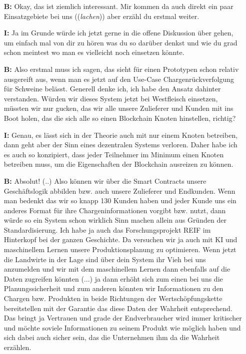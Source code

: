 \begin{itemize}
  \item[\textbf{B:}] Okay, das ist ziemlich interessant. Mir kommen da auch direkt ein paar Einsatzgebiete bei uns ((\textit{lachen})) aber erzähl du erstmal weiter.
  \item[\textbf{I:}] Ja im Grunde würde ich jetzt gerne in die offene Diskussion über gehen, um einfach mal von dir zu hören was du so darüber denkst und wie du grad schon meintest wo man es vielleicht noch einsetzen könnte.
  \item[\textbf{B:}] Also erstmal muss ich sagen, das sieht für einen Prototypen schon relativ ausgereift aus, wenn man es jetzt auf den Use-Case Chargenrückverfolgung für Schweine belässt. Generell denke ich, ich habe den Ansatz dahinter verstanden. Würden wir dieses System jetzt bei Westfleisch einsetzen, müssten wir nur gucken, das wir alle unsere Zulieferer und Kunden mit ins Boot holen, das die sich alle so einen Blockchain Knoten hinstellen, richtig?
  \item[\textbf{I:}] Genau, es lässt sich in der Theorie auch mit nur einem Knoten betreiben, dann geht aber der Sinn eines dezentralen Systems verloren. Daher habe ich es auch so konzipiert, dass jeder Teilnehmer im Minimum einen Knoten betreiben muss, um die Eigenschaften der Blockchain ausreizen zu können.
  \item[\textbf{B:}] Absolut! (..) Also können wir über die Smart Contracts unsere Geschäftslogik abbilden bzw. auch unsere Zulieferer und Endkunden. Wenn man bedenkt das wir so knapp 130 Kunden haben und jeder Kunde uns ein anderes Format für ihre Chargeninformationen vorgibt bzw. nutzt, dann würde so ein System schon wirklich Sinn machen allein aus Gründen der Standardisierung. Ich habe ja auch das Forschungsprojekt REIF im Hinterkopf bei der ganzen Geschichte. Da versuchen wir ja auch mit KI und maschinellem Lernen unsere Produktionsplanung zu optimieren. Wenn jetzt die Landwirte in der Lage sind über dein System ihr Vieh bei uns anzumelden und wir mit dem maschinellem Lernen dann ebenfalls auf die Daten zugreifen könnten (...) ja dann erhöht sich zum einen bei uns die Planungssicherheit und zum anderen könnten wir Informationen zu den Chargen bzw. Produkten in beide Richtungen der Wertschöpfungskette bereitstellen mit der Garantie das diese Daten der Wahrheit entsprechend. Das bringt ja Vertrauen und grade der Endverbraucher wird immer kritischer und möchte soviele Informationen zu seinem Produkt wie möglich haben und sich dabei auch sicher sein, das die Unternehmen ihm da die Wahrheit erzählen.

\end{itemize}
